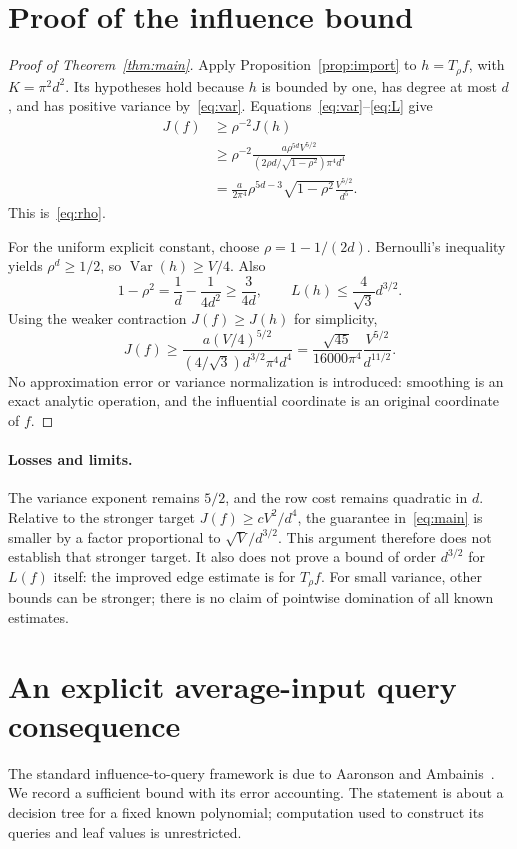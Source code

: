 \documentclass[11pt]{article}
\theoremstyle{remark}\newtheorem{remark}[theorem]{Remark}
\newcommand{\Var}{\operatorname{Var}}
\begin{document}
\section{Proof of the influence bound}
\begin{proof}[Proof of Theorem~\ref{thm:main}]
Apply Proposition~\ref{prop:import} to $h=T_\rho f$, with $K=\pi^2d^2$. Its hypotheses hold because $h$ is bounded by one, has degree at most $d$, and has positive variance by~\eqref{eq:var}. Equations~\eqref{eq:var}--\eqref{eq:L} give
\begin{align*}
 J(f)&\ge\rho^{-2}J(h)\\
 &\ge\rho^{-2}\frac{a\rho^{5d}V^{5/2}}
             {(2\rho d/\sqrt{1-\rho^2})\pi^4d^4}\\
 &=\frac{a}{2\pi^4}\rho^{5d-3}\sqrt{1-\rho^2}
          \frac{V^{5/2}}{d^5}.
\end{align*}
This is~\eqref{eq:rho}.

For the uniform explicit constant, choose $\rho=1-1/(2d)$. Bernoulli's inequality yields $\rho^d\ge1/2$, so $\Var(h)\ge V/4$. Also
\[
 1-\rho^2=\frac1d-\frac1{4d^2}\ge\frac{3}{4d},\qquad
 L(h)\le\frac4{\sqrt3}d^{3/2}.
\]
Using the weaker contraction $J(f)\ge J(h)$ for simplicity,
\[
 J(f)\ge\frac{a(V/4)^{5/2}}{(4/\sqrt3)d^{3/2}\pi^4d^4}
       =\frac{\sqrt{45}}{16000\pi^4}\frac{V^{5/2}}{d^{11/2}}.
\]
No approximation error or variance normalization is introduced: smoothing is an exact analytic operation, and the influential coordinate is an original coordinate of $f$.
\end{proof}

\paragraph{Losses and limits.}
The variance exponent remains $5/2$, and the row cost remains quadratic in $d$. Relative to the stronger target $J(f)\ge cV^2/d^4$, the guarantee in~\eqref{eq:main} is smaller by a factor proportional to $\sqrt V/d^{3/2}$. This argument therefore does not establish that stronger target. It also does not prove a bound of order $d^{3/2}$ for $L(f)$ itself: the improved edge estimate is for $T_\rho f$. For small variance, other bounds can be stronger; there is no claim of pointwise domination of all known estimates.

\section{An explicit average-input query consequence}
The standard influence-to-query framework is due to Aaronson and Ambainis~\cite{AA}. We record a sufficient bound with its error accounting. The statement is about a decision tree for a fixed known polynomial; computation used to construct its queries and leaf values is unrestricted.
\end{document}
